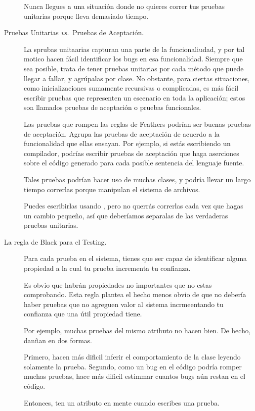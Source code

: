 \documentclass[a4paper,10pt,twoside]{book}
\begin{document}
\begin{description}
Nunca llegues a una situaci\'on donde no quieres correr tus pruebas unitarias porque
lleva demasiado tiempo.


\item[Pruebas Unitarias \textit{vs.}\ Pruebas de Aceptaci\'on.] La sprubas unitaarias capturan una parte de la funcionaliudad, y por tal motico hacen f\'acil identificar los bugs en esa funcionalidad.
	Siempre que sea posible, trata de tener pruebas unitarias por cada m\'etodo que puede llegar a fallar, y agr\'upalas por clase. No obstante, para ciertas situaciones, como inicializaciones sumamente recursivas o complicadas, es m\'as f\'acil escribir pruebas que representen un escenario en toda la aplicaci\'on; estos son llamados pruebas de aceptaci\'on o pruebas funcionales. 

Las pruebas que rompen las reglas de  Feathers podr\'ian ser buenas pruebas de aceptaci\'on.
	Agrupa las pruebas de aceptaci\'on de acuerdo a la funcionalidad que ellas ensayan.
Por ejemplo, si est\'as escribiendo un compilador, podr\'ias escribir pruebas de aceptaci\'on que haga aserciones
sobre el c\'odigo generado para cada posible sentencia del lenguaje fuente. 

Tales pruebas podr\'ian hacer uso de muchas clases, y podr\'ia llevar un largo tiempo correrlas porque
manipulan el sistema de archivos.

Puedes escribirlas usando \sunit, pero no querr\'as correrlas cada vez que hagas un cambio peque\~no, 
as\'i que deber\'iamos separalas de las verdaderas pruebas unitarias.
 
\item[La regla de Black para el Testing.]

  Para cada prueba en el sistema, tienes que ser capaz de identificar alguna propiedad a la cual tu prueba incrementa tu confianza.

Es obvio que habr\'an propiedades no importantes que no estas comprobando.
Esta regla plantea el hecho menos obvio de que no deber\'ia haber pruebas que no agreguen valor al sistema incrmeentando tu confianza que una \'util propiedad tiene.

Por ejemplo, muchas pruebas del mismo atributo no hacen bien.
De hecho, dan\~nan en dos formas.

Primero, hacen m\'as dificil inferir el comportamiento de la  clase leyendo solamente la prueba.
Segundo, como un bug en el c\'odigo podr\'ia romper muchas pruebas, hace m\'as dificil estimmar cuantos bugs
a\'un restan en el c\'odigo.

Entonces, ten un atributo en mente cuando escribes una prueba.

\end{description}
\end{document}
